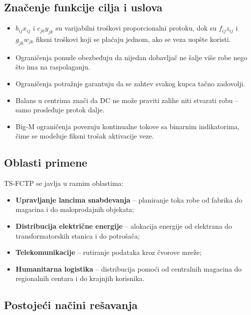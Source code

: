 \documentclass[12pt,a4paper]{article}
\begin{document}
\subsection{Značenje funkcije cilja i uslova}
\begin{itemize}
    \item $b_{ij}x_{ij}$ i $c_{jk}y_{jk}$ su varijabilni troškovi proporcionalni
      protoku, dok su $f_{ij}z_{ij}$ i $g_{jk}w_{jk}$ fiksni troškovi koji se
      plaćaju jednom, ako se veza uopšte koristi.
    \item Ograničenja ponude obezbeđuju da nijedan dobavljač ne šalje više
      robe nego što ima na raspolaganju.
    \item Ograničenja potražnje garantuju da se zahtev svakog kupca tačno
      zadovolji.
    \item Balans u centrima znači da DC ne može praviti zalihe niti stvarati
      robu -- samo prosleđuje protok dalje.
    \item Big-M ograničenja povezuju kontinualne tokove sa binarnim
      indikatorima, čime se modeluje fiksni trošak aktivacije veze.
\end{itemize}

\subsection{Oblasti primene}

TS-FCTP se javlja u raznim oblastima:
\begin{itemize}
  \item \textbf{Upravljanje lancima snabdevanja} -- planiranje toka robe
    od fabrika do magacina i do maloprodajnih objekata;
  \item \textbf{Distribucija električne energije} -- alokacija energije od
    elektrana do transformatorskih stanica i do potrošača;
  \item \textbf{Telekomunikacije} -- rutiranje podataka kroz čvorove mreže;
  \item \textbf{Humanitarna logistika} -- distribucija pomoći od centralnih
    magacina do regionalnih centara i do krajnjih korisnika.
\end{itemize}

\subsection{Postojeći načini rešavanja}
\end{document}
